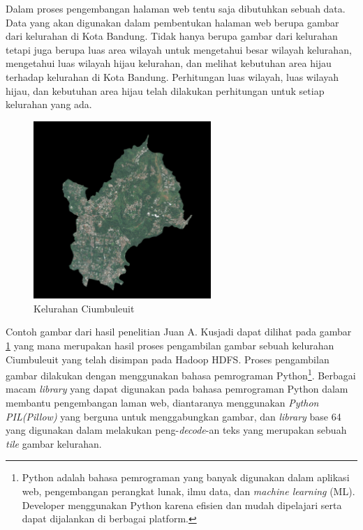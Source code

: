 \documentclass[a4paper,twoside]{article}
\begin{document}
Dalam proses pengembangan halaman web tentu saja dibutuhkan sebuah data. Data yang akan digunakan dalam pembentukan halaman web berupa gambar dari kelurahan di Kota Bandung. Tidak hanya berupa gambar dari kelurahan tetapi juga berupa luas area wilayah untuk mengetahui besar wilayah kelurahan, mengetahui luas wilayah hijau kelurahan, dan melihat kebutuhan area hijau terhadap kelurahan di Kota Bandung. Perhitungan luas wilayah, luas wilayah hijau, dan kebutuhan area hijau telah dilakukan perhitungan untuk setiap kelurahan yang ada. 

\begin{figure}[H]
	\centering
	\includegraphics[width=0.6\textwidth]{Ciumbuleuit.png}
	\caption{Kelurahan Ciumbuleuit}
	\label{fig:ciumbuleuit}
\end{figure}



Contoh gambar dari hasil penelitian Juan A. Kusjadi dapat dilihat pada gambar \ref{fig:ciumbuleuit} yang mana merupakan hasil proses pengambilan gambar sebuah kelurahan Ciumbuleuit yang telah disimpan pada Hadoop HDFS. Proses pengambilan gambar dilakukan dengan menggunakan bahasa pemrograman Python\footnote{Python adalah bahasa pemrograman yang banyak digunakan dalam aplikasi web, pengembangan perangkat lunak, ilmu data, dan \textit{machine learning} (ML). Developer menggunakan Python karena efisien dan mudah dipelajari serta dapat dijalankan di berbagai platform.}. Berbagai macam \textit{library} yang dapat digunakan pada bahasa pemrograman Python dalam membantu pengembangan laman web, diantaranya menggunakan \textit{Python PIL(Pillow)} yang berguna untuk menggabungkan gambar, dan \textit{library} base 64 yang digunakan dalam melakukan peng-\textit{decode}-an teks yang merupakan sebuah \textit{tile} gambar kelurahan.
\end{document}
